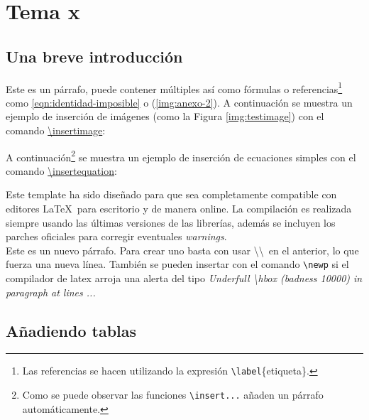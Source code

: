 \section{Tema x}

\subsection{Una breve introducción}
	
	Este es un párrafo, puede contener múltiples  así como fórmulas o referencias\footnote{Las referencias se hacen utilizando la expresión \texttt{\textbackslash label}\{etiqueta\}.} como \eqref{eqn:identidad-imposible} o (\ref{img:anexo-2}). A continuación se muestra un ejemplo de inserción de imágenes (como la Figura \ref{img:testimage}) con el comando \href{https://latex.ppizarror.com/informe.html#hlp-imagen}{\textbackslash insertimage}:



	A continuación\footnote{Como se puede observar las funciones \texttt{\textbackslash insert...} añaden un párrafo automáticamente.} se muestra un ejemplo de inserción de ecuaciones simples con el comando \href{https://latex.ppizarror.com/informe.html#hlp-formulae}{\textbackslash insertequation}:


	Este template \cite{template} ha sido diseñado para que sea completamente compatible con editores \LaTeX\ para escritorio y de manera online. La compilación es realizada siempre usando las últimas versiones de las librerías, además se incluyen los parches oficiales para corregir eventuales \textit{warnings}. \\

	Este es un nuevo párrafo. Para crear uno basta con usar \textbackslash\textbackslash\ en el anterior, lo que fuerza una nueva línea. También se pueden insertar con el comando \texttt{\textbackslash newp} si el compilador de latex arroja una alerta del tipo \textit{Underfull \textbackslash hbox (badness 10000) in paragraph at lines ...}

\subsection{Añadiendo tablas}


